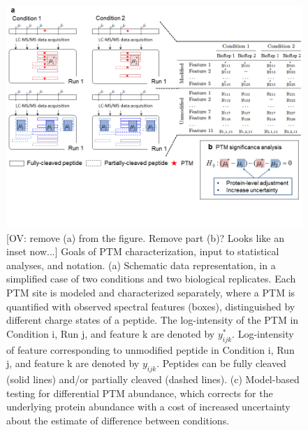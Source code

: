 \documentclass[mcp]{article}
\numberwithin{table}{section}
\def\todo#1{{\color{red}[#1]}}
\begin{document}
\begin{figure}[ht]
\centering
\includegraphics[scale=.6]{images/fig3.png}
\caption{\todo{OV: remove (a) from the figure. Remove part (b)? Looks like an inset now...} Goals of PTM characterization, input to statistical analyses, and notation. (a) Schematic data representation, in a simplified case of two conditions and two biological replicates. Each PTM site is modeled and characterized separately, where a PTM is quantified with observed spectral features (boxes), distinguished by different charge states of a peptide. The log-intensity of the PTM in Condition i, Run j, and feature k are denoted by $y_{ijk}^{\ast}$. Log-intensity of feature corresponding to unmodified peptide in Condition i, Run j, and feature k are denoted by $y_{ijk}$. Peptides can be fully cleaved (solid lines) and/or partially cleaved (dashed lines). (c) Model-based testing for differential PTM abundance, which corrects for the underlying protein abundance with a cost of increased uncertainty about the estimate of difference between conditions.}
\label{fig:data-structure}
\end{figure}
\end{document}
